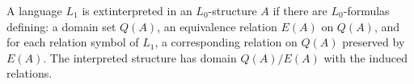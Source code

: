 A language $L_1$ is 	ext{interpreted} in an $L_0$-structure $A$ if there are $L_0$-formulas defining: a domain set $Q(A)$, an equivalence relation $E(A)$ on $Q(A)$, and for each relation symbol of $L_1$, a corresponding relation on $Q(A)$ preserved by $E(A)$. The interpreted structure has domain $Q(A)/E(A)$ with the induced relations.
